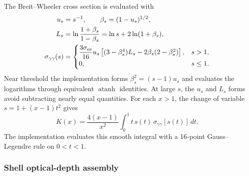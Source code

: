 \documentclass[twocolumn]{aastex702}
\begin{document}
The Breit--Wheeler cross section is evaluated with
\begin{equation}
\begin{aligned}
u_s&=s^{-1},\qquad \beta_s=(1-u_s)^{1/2},\\
L_s&=\ln\frac{1+\beta_s}{1-\beta_s}
=\ln s+2\ln(1+\beta_s),\\
\sigma_{\gamma\gamma}(s)&=
\begin{cases}
\dfrac{3\sigma_{\rm es}}{16}u_s
\left[(3-\beta_s^4)L_s-2\beta_s(2-\beta_s^2)\right], & s>1,\\
0, & s\le1 .
\end{cases}
\end{aligned}
\end{equation}
Near threshold the implementation forms \(\beta_s^2=(s-1)u_s\) and evaluates
the logarithms through equivalent \(\operatorname{atanh}\) identities.  At large
\(s\), the \(u_s\) and \(L_s\) forms avoid subtracting nearly equal quantities.
For each \(x>1\), the change of variable
\(s=1+(x-1)t^2\) gives
\begin{equation}
K(x)=\frac{4(x-1)}{x^2}\int_0^1
t\,s(t)\,\sigma_{\gamma\gamma}[s(t)]\,dt .
\end{equation}
The implementation evaluates this smooth integral with a 16-point
Gauss--Legendre rule on \(0<t<1\).

\subsubsection{Shell optical-depth assembly}
\end{document}
